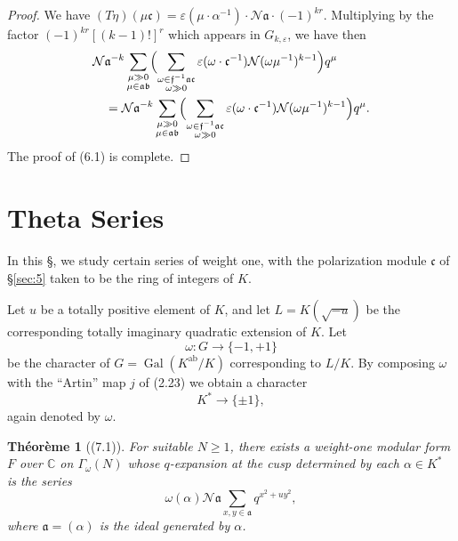 \documentclass[12pt,a4paper]{article}
\theoremstyle{plain}
\newtheorem{theorem}{Th\'{e}or\`{e}me}[section]
\theoremstyle{definition}
\theoremstyle{remark}
\DeclareMathOperator{\Gal}{Gal}
\begin{document}
\begin{proof}
We have $(T\eta)(\mu\mathfrak{c}) = \varepsilon(\mu \cdot \alpha^{-1}) \cdot \mathcal{N}\mathfrak{a} \cdot (-1)^{kr}$. Multiplying by the factor $(-1)^{kr}[(k-1)!]^r$ which appears in $G_{k,\varepsilon}$, we have then
\begin{align*}
&\mathcal{N}\mathfrak{a}^{-k} \sum_{\substack{\mu \gg 0 \\ \mu \in \mathfrak{a}\mathfrak{b}}} \Bigl(\sum_{\substack{\omega \in \mathfrak{f}^{-1}\mathfrak{a}\mathfrak{c} \\ \omega \gg 0}} \varepsilon(\omega \cdot \mathfrak{c}^{-1}) \mathcal{N}(\omega\mu^{-1})^{k-1}\Bigr) q^\mu \\
&\quad = \mathcal{N}\mathfrak{a}^{-k} \sum_{\substack{\mu \gg 0 \\ \mu \in \mathfrak{a}\mathfrak{b}}} \Bigl(\sum_{\substack{\omega \in \mathfrak{f}^{-1}\mathfrak{a}\mathfrak{c} \\ \omega \gg 0}} \varepsilon(\omega \cdot \mathfrak{c}^{-1}) \mathcal{N}(\omega\mu^{-1})^{k-1}\Bigr) q^\mu.
\end{align*}
The proof of (6.1) is complete.
\end{proof}


\section{Theta Series}\label{sec:7}

In this \S, we study certain series of weight one, with the polarization module $\mathfrak{c}$ of \S\ref{sec:5} taken to be the ring of integers of $K$.

Let $u$ be a totally positive element of $K$, and let $L = K(\sqrt{-u})$ be the corresponding totally imaginary quadratic extension of $K$. Let
\[
\omega: G \to \{-1, +1\}
\]
be the character of $G = \Gal(K^{\mathrm{ab}}/K)$ corresponding to $L/K$. By composing $\omega$ with the ``Artin'' map $j$ of (2.23) we obtain a character
\[
K^* \to \{\pm 1\},
\]
again denoted by $\omega$.

\begin{theorem}[(7.1)]\label{thm:7.1}
For suitable $N \ge 1$, there exists a weight-one modular form $F$ over $\mathbb{C}$ on $\Gamma_{\omega}(N)$ whose $q$-expansion at the cusp determined by each $\alpha \in K^*$ is the series
\[
\omega(\alpha) \mathcal{N}\mathfrak{a} \sum_{x,y \in \mathfrak{a}} q^{x^2 + u y^2},
\]
where $\mathfrak{a} = (\alpha)$ is the ideal generated by $\alpha$.
\end{theorem}
\end{document}
